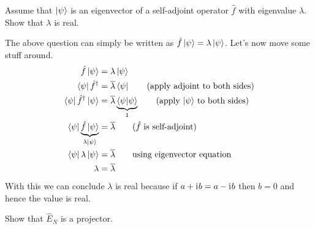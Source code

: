 \documentclass[boxes,pages]{homework}
\makeatletter
\newcommand{\iu}{\mathrm{i}\mkern1mu}
\newcommand{\herm}[1]{{{#1}^\dagger}}
\numberwithin{@problem}{section}
\makeatother
\begin{document}
\begin{problem}
Assume that $\ket{\psi}$ is an eigenvector of a self-adjoint operator $\hat{f}$ with eigenvalue $\lambda$. Show that $\lambda$ is real.
\end{problem}

\begin{solution}
	The above question can simply be written as $\hat{f}\ket{\psi} = \lambda\ket{\psi}$. Let's now move some stuff around.
	\begin{align*}
		\hat{f}\ket{\psi}                                            & = \lambda\ket{\psi}                                                                             \\
		\bra{\psi}\herm{\hat{f}}                                     & = \overline{\lambda}\bra{\psi} \tag{apply adjoint to both sides}                                \\
		\bra{\psi}\herm{\hat{f}}\ket{\psi}                           & = \overline{\lambda}\underbrace{\braket{\psi}{\psi}}_{1} \tag{apply $\ket{\psi}$ to both sides} \\
		\bra{\psi}\underbrace{\hat{f}\ket{\psi}}_{\lambda\ket{\psi}} & = \overline{\lambda} \tag{$\hat{f}$ is self-adjoint}                                            \\
		\bra{\psi}\lambda\ket{\psi}                                  & = \overline{\lambda} \tag*{using eigenvector equation}                                          \\
		\lambda                                                      & = \overline{\lambda}
	\end{align*}
	With this we can conclude $\lambda$ is real because if $a+\iu b = a - \iu b$ then $b = 0$ and hence the value is real.
\end{solution}

\begin{problem}
Show that $\hat{E}_N$ is a projector.
\end{problem}
\end{document}
